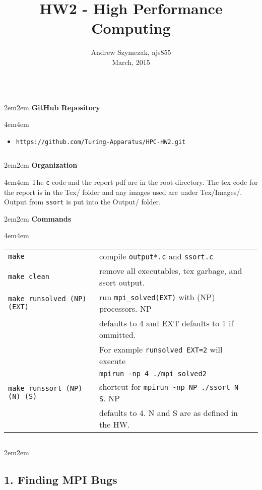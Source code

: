 \documentclass{article}
\title{HW2 - High Performance Computing\\}
\author{Andrew Szymczak, ajs855\\ March, 2015\\ }
\date{}
\let\b\textbf                                               %
\let\tt\texttt                                              %
\newcommand{\aw}[1]{\begin{adjustwidth}{{#1}em}{{#1}em}}    %
\newcommand{\eaw}{\end{adjustwidth}}                        %
\newcommand{\nl}{$\;$\\}                                    %
\begin{document}
\maketitle



\nl \nl \nl

\aw{2}
\b{GitHub Repository \\}
\eaw
    \aw{4}
    \begin{itemize}
            \item \texttt{https://github.com/Turing-Apparatus/HPC-HW2.git}
    \end{itemize}
    \nl \nl
    \eaw


\aw{2}
\b{Organization \\}
\eaw
    \aw{4}
    The \tt{c} code and the report pdf are in the root directory. The tex code for the report is
    in the Tex/ folder and any images used are under Tex/Images/. Output from \tt{ssort} is put
    into the Output/ folder.
    \nl \nl
    \eaw


\aw{2}
\b{Commands \\}
\eaw
    \aw{4}
    \begin{tabular}{lll}
        \tt{make} & compile \tt{output*.c} and \tt{ssort.c} \\
        \tt{make clean} & remove all executables, tex garbage, and ssort output. \\
        \tt{make runsolved (NP) (EXT)} & run \tt{mpi\_solved(EXT)} with (NP) processors. NP \\
            &defaults to 4 and EXT defaults to 1 if ommitted. \\ & For example
            \tt{runsolved EXT=2} will execute \\ & \tt{mpirun -np 4 ./mpi\_solved2} \\
        \tt{make runssort (NP) (N) (S)} & shortcut for \tt{mpirun -np NP ./ssort N S}. NP \\
            & defaults to 4. N and S are as defined in the HW.
    \end{tabular}
    \nl \nl
    \eaw

\newpage


\aw{2}
\subsection*{1. Finding MPI Bugs\\}
\eaw
\end{document}
